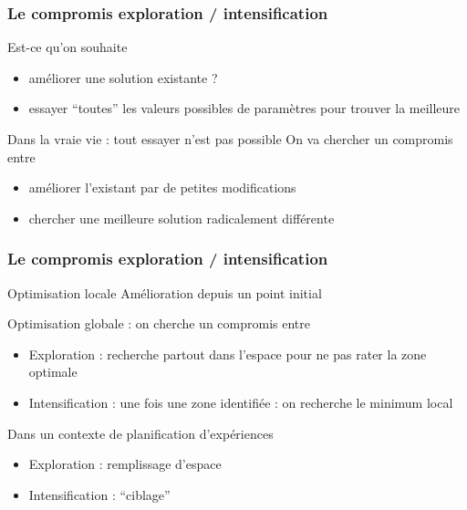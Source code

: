 \documentclass{beamer}
\begin{document}
\begin{frame}
  \frametitle{Le compromis \textbf{exploration / intensification}}
  
  
  \begin{block}{Est-ce qu'on souhaite}
  \begin{itemize}
   \item améliorer une solution existante ?
   \item essayer ``toutes'' les valeurs possibles de paramètres pour trouver la meilleure
  \end{itemize}
 \end{block}

  \begin{block}{Dans la vraie vie : tout essayer n'est pas possible}
  On va chercher un compromis entre 
  \begin{itemize}
   \item améliorer l'existant par de petites modifications
   \item chercher une meilleure solution radicalement différente
  \end{itemize}
  \end{block}
  
\end{frame}
\begin{frame}
  \frametitle{Le compromis \textbf{exploration / intensification}}
  \begin{block}{Optimisation locale}
Amélioration depuis un point initial
  \end{block}

  \begin{block}{Optimisation globale : on cherche un compromis entre}
  \begin{itemize}
   \item Exploration : recherche partout dans l'espace pour ne pas rater la zone optimale 
   \item Intensification : une fois une zone identifiée : on recherche le minimum local
  \end{itemize}
  \end{block}
  
\begin{exampleblock}{Dans un contexte de planification d'expériences}
  \begin{itemize}
   \item Exploration : remplissage d'espace
   \item Intensification : ``ciblage''
  \end{itemize}
\end{exampleblock}
  
\end{frame}
\end{document}
